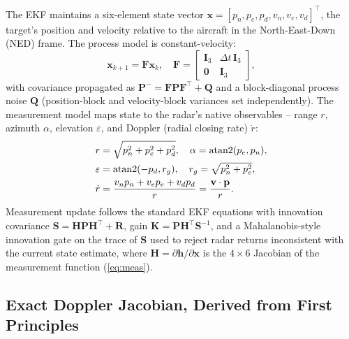 \documentclass[conference]{IEEEtran}
\begin{document}
The EKF maintains a six-element state vector $\mathbf{x} = [p_n, p_e, p_d, v_n, v_e, v_d]^\top$, the target's position and velocity relative to the aircraft in the North-East-Down (NED) frame. The process model is constant-velocity:
\begin{equation}
\mathbf{x}_{k+1} = \mathbf{F}\mathbf{x}_k, \quad
\mathbf{F} = \begin{bmatrix} \mathbf{I}_3 & \Delta t \, \mathbf{I}_3 \\ \mathbf{0} & \mathbf{I}_3 \end{bmatrix},
\label{eq:process}
\end{equation}
with covariance propagated as $\mathbf{P}^- = \mathbf{F}\mathbf{P}\mathbf{F}^\top + \mathbf{Q}$ and a block-diagonal process noise $\mathbf{Q}$ (position-block and velocity-block variances set independently). The measurement model maps state to the radar's native observables -- range $r$, azimuth $\alpha$, elevation $\varepsilon$, and Doppler (radial closing rate) $\dot r$:
\begin{align}
r &= \sqrt{p_n^2+p_e^2+p_d^2}, \quad
\alpha = \operatorname{atan2}(p_e, p_n), \notag \\
\varepsilon &= \operatorname{atan2}(-p_d, r_g), \quad r_g = \sqrt{p_n^2+p_e^2}, \notag \\
\dot r &= \frac{v_n p_n + v_e p_e + v_d p_d}{r} = \frac{\mathbf{v}\cdot\mathbf{p}}{r}.
\label{eq:meas}
\end{align}
Measurement update follows the standard EKF equations \cite{r1,r4} with innovation covariance $\mathbf{S} = \mathbf{H}\mathbf{P}\mathbf{H}^\top + \mathbf{R}$, gain $\mathbf{K} = \mathbf{P}\mathbf{H}^\top \mathbf{S}^{-1}$, and a Mahalanobis-style innovation gate on the trace of $\mathbf{S}$ used to reject radar returns inconsistent with the current state estimate, where $\mathbf{H} = \partial \mathbf{h}/\partial \mathbf{x}$ is the $4\times 6$ Jacobian of the measurement function (\ref{eq:meas}).

\subsection{Exact Doppler Jacobian, Derived from First Principles}
\label{sec:jacobian_derivation}
\end{document}
